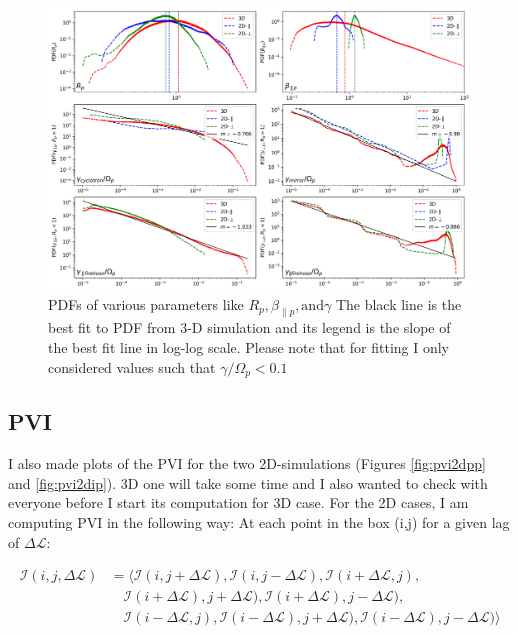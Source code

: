 \documentclass[column]{aastex62}
\begin{document}
		\begin{figure}
			\begin{center}
				\includegraphics[width=1.05\textwidth]{pdfs.png}
				\caption{PDFs of various parameters like $R_p, \beta_{\parallel p}, \mathrm{and} \gamma$ The black line is the best fit to PDF from 3-D simulation and its legend is the slope of the best fit line in log-log scale. Please note that for fitting I only considered values such that $\gamma/\Omega_p <0.1$}
				\label{fig:pdfs}
			\end{center}
		\end{figure}

        \subsection{PVI} \label{sec:pvi}
            I also made plots of the PVI for the two 2D-simulations (Figures \ref{fig:pvi2dpp} and \ref{fig:pvi2dip}). 3D one will take some time and I also wanted to check with everyone before I start its computation for 3D case.
            For the 2D cases, I am computing PVI in the following way:
            At each point in the box (i,j) for a given lag of $\Delta \mathcal{L}$:
            
            \begin{align*} \label{eqn:pvi1}
		        \mathcal{I}(i, j, \Delta \mathcal{L}) &= \langle  \mathcal{I}(i, j + \Delta \mathcal{L}), \mathcal{I}(i, j - \Delta \mathcal{L}), \mathcal{I}(i + \Delta \mathcal{L}, j), \\
		        &\quad \mathcal{I}(i + \Delta \mathcal{L}), j + \Delta \mathcal{L}), \mathcal{I}(i + \Delta \mathcal{L}), j - \Delta \mathcal{L}), \\
		        &\quad \mathcal{I}(i - \Delta \mathcal{L}, j), \mathcal{I}(i - \Delta \mathcal{L}), j + \Delta \mathcal{L}), \mathcal{I}(i - \Delta \mathcal{L}), j - \Delta \mathcal{L}) \rangle
		    \end{align*}
\end{document}
